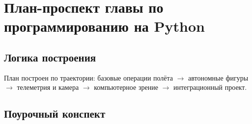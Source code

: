 \section{План-проспект главы по программированию на Python}

\subsection*{Логика построения}
План построен по траектории: базовые операции полёта $\rightarrow$ автономные фигуры $\rightarrow$ телеметрия и камера $\rightarrow$ компьютерное зрение $\rightarrow$ интеграционный проект.

\subsection*{Поурочный конспект}
